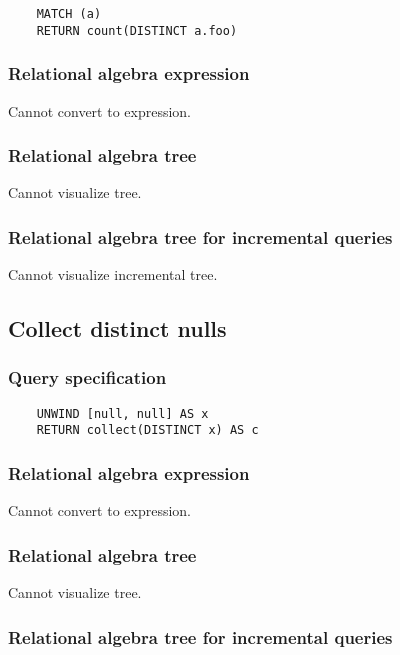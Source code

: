 	\begin{lstlisting}
	MATCH (a)
	RETURN count(DISTINCT a.foo)
	\end{lstlisting}


	\subsubsection*{Relational algebra expression}

	Cannot convert to expression.

	\subsubsection*{Relational algebra tree}

	Cannot visualize tree.

	\subsubsection*{Relational algebra tree for incremental queries}

	Cannot visualize incremental tree.
	\subsection{Collect distinct nulls}

	\subsubsection*{Query specification}

	\begin{lstlisting}
	UNWIND [null, null] AS x
	RETURN collect(DISTINCT x) AS c
	\end{lstlisting}


	\subsubsection*{Relational algebra expression}

	Cannot convert to expression.

	\subsubsection*{Relational algebra tree}

	Cannot visualize tree.

	\subsubsection*{Relational algebra tree for incremental queries}


